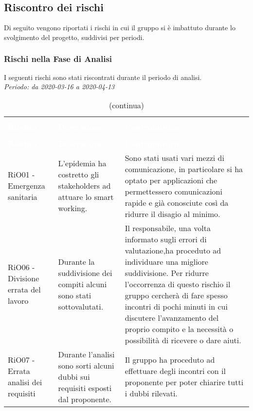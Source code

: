 \pagebreak


\subsection{Riscontro dei rischi}
Di seguito vengono riportati i rischi in cui il gruppo si è imbattuto durante lo svolgimento del progetto, suddivisi per periodi.

\subsubsection{Rischi nella Fase di Analisi}
I seguenti rischi sono stati riscontrati durante il periodo di analisi. \\
\textit{Periodo: da 2020-03-16 a 2020-04-13}

\begin{longtable}{C{3cm} L{5cm} L{7cm}}
\caption{Attualizzazione dei rischi - Analisi} \\
\textcolor{white}{\textbf{Rischio}} &
\textcolor{white}{\textbf{Descrizione}} &
\textcolor{white}{\textbf{Contromisura}}\\
		\endfirsthead
		\caption[]{(continua)} \\
\textcolor{white}{\textbf{Rischio}} &
\textcolor{white}{\textbf{Descrizione}} &
\textcolor{white}{\textbf{Contromisura}}\\
		\endhead

RiO01 - Emergenza sanitaria	& L'epidemia ha costretto gli stakeholders ad attuare lo smart working. & Sono stati usati vari mezzi di comunicazione, in particolare si ha optato per applicazioni che permettessero comunicazioni rapide e già conosciute così da ridurre il disagio al minimo.
\\
RiO06 - Divisione errata del lavoro & Durante la suddivisione dei compiti alcuni sono stati sottovalutati. & Il responsabile, una volta informato sugli errori di valutazione,ha proceduto ad individuare una migliore suddivisione. Per ridurre l'occorrenza di questo rischio il gruppo cercherà di fare spesso incontri di pochi minuti in cui discutere l'avanzamento del proprio compito e la necessità o possibilità di ricevere o dare aiuti.
\\
RiO07 - Errata analisi dei requisiti & Durante l'analisi sono sorti alcuni dubbi sui requisiti esposti dal proponente. & Il gruppo ha proceduto ad effettuare degli incontri con il proponente per poter chiarire tutti i dubbi rilevati.
\\

\end{longtable}


